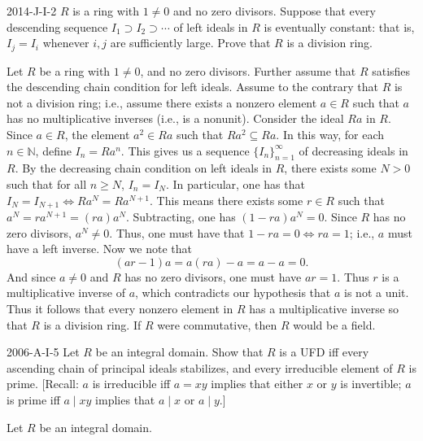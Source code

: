 \documentclass{article}
\begin{document}
	\begin{prb}{2014-J-I-2}
		$R$ is a ring with $1 \neq 0$ and no zero divisors. Suppose that every descending sequence $I_{1} \supset I_{2} \supset \dotsm$ of left ideals in $R$ is eventually constant: that is, $I_{j} = I_{i}$ whenever $i, j$ are sufficiently large. Prove that $R$ is a division ring. 
	\end{prb}
	Let $R$ be a ring with $1 \neq 0$, and no zero divisors. Further assume that $R$ satisfies the descending chain condition for left ideals. Assume to the contrary that $R$ is not a division ring; i.e., assume there exists a nonzero element $a \in R$ such that $a$ has no multiplicative inverses (i.e., is a nonunit). Consider the ideal $Ra$ in $R$. Since $a \in R$, the element $a^2 \in Ra$ such that $Ra^2 \subseteq Ra$. In this way, for each $n \in \mathbb{N}$, define $I_{n}= Ra^{n}$. This gives us a sequence $\{I_{n}\}_{n = 1}^{\infty}$ of decreasing ideals in $R$. By the decreasing chain condition on left ideals in $R$, there exists some $N > 0$ such that for all $n \geq N$, $I_{n} = I_{N}$. In particular, one has that $I_{N} = I_{N + 1} \iff Ra^{N} = Ra^{N + 1}$. This means there exists some $r \in R$ such that $a^{N} = ra^{N + 1} = (ra)a^{N}$. Subtracting, one has $(1 - ra)a^{N} = 0$. Since $R$ has no zero divisors, $a^{N} \neq 0$. Thus, one must have that $1 - ra = 0 \iff ra = 1$; i.e., $a$ must have a left inverse. Now we note that 
	\begin{equation*}
		(ar - 1)a = a(ra) - a = a - a = 0. 
	\end{equation*}
	And since $a \neq 0$ and $R$ has no zero divisors, one must have $ar = 1$. Thus $r$ is a multiplicative inverse of $a$, which contradicts our hypothesis that $a$ is not a unit. Thus it follows that every nonzero element in $R$ has a multiplicative inverse so that $R$ is a division ring. If $R$ were commutative, then $R$ would be a field. 
	
	\begin{prb}{2006-A-I-5}
		Let $R$ be an integral domain. Show that $R$ is a UFD iff every ascending chain of principal ideals stabilizes, and every irreducible element of $R$ is prime. [Recall: $a$ is irreducible iff $a = xy$ implies that either $x$ or $y$ is invertible; $a$ is prime iff $a \mid xy$ implies that $a \mid x$ or $a \mid y$.]
	\end{prb}
	Let $R$ be an integral domain. 
	
\end{document}
